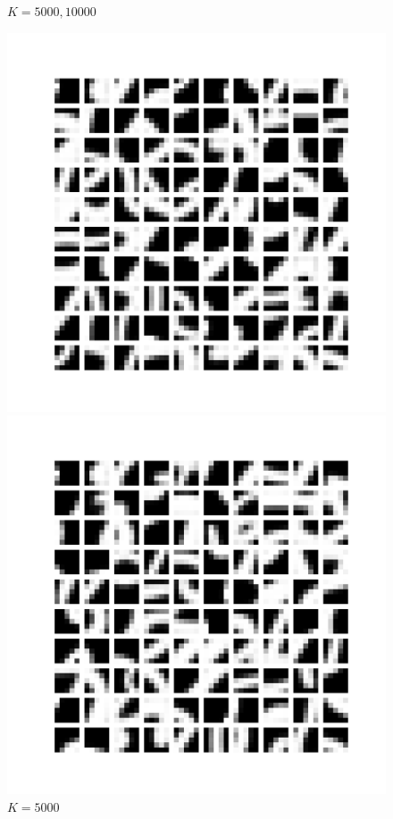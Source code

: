 \documentclass{article}
\begin{document}
\begin{itemize}
\begin{figure}[htbp!]
\begin{minipage}{0.4\textwidth}
        \caption{ $K = 1000$}
        \label{fig:1000-centroids}
    \end{minipage}
\item $K = 5000, 10000$    
    \begin{minipage}{0.4\textwidth}
        \centering
        \includegraphics[width=\textwidth]{K-means/Result/Centroids/5000-clusters-centroids.png}
        \caption{$K = 5000$}
        \label{fig:5000-centroids}
    \end{minipage}%
    \begin{minipage}{0.4\textwidth}
        \centering
        \includegraphics[width=\textwidth]{K-means/Result/Centroids/10000-clusters-centroids.png}

\end{minipage}
\end{figure}
\end{itemize}
\end{document}
